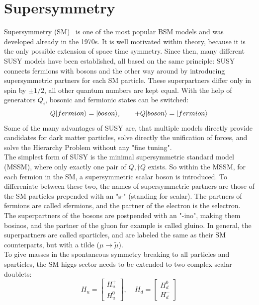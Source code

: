 \section{Supersymmetry}\label{sec:SUSY}
Supersymmetry (SM)~\cite{SUSYOriginal,SUSYPrimer} is one of the most popular BSM models and was developed already in the 1970s. It is well motivated within theory, because it is the only possible extension of space time symmetry. Since then, many different SUSY models have been established, all based on the same principle: SUSY connects fermions with bosons and the other way around by introducing supersymmetric partners for each SM particle. These superpartners differ only in spin by $\pm1/2$, all other quantum numbers are kept equal. With the help of generators $Q_i$, bosonic and fermionic states can be switched:
\begin{equation}
  Q\lvert fermion\rangle=\lvert boson\rangle,~~~~~~+ Q\lvert boson\rangle=\lvert fermion\rangle
\end{equation}
Some of the many advantages of SUSY are, that multiple models directly provide candidates for dark matter particles, solve directly the unification of forces, and solve the Hierarchy Problem without any "fine tuning".\\
The simplest form of SUSY is the minimal supersymmetric standard model (MSSM), where only exactly one pair of $Q,\dagger{Q}$ exists. So within the MSSM, for each fermion in the SM, a supersymmetric scalar boson is introduced. To differeniate between these two, the names of supersymmetric partners are those of the SM particles prepended with an "s-" (standing for scalar). The partners of fermions are called sfermions, and \eg the partner of the electron is the selectron. The superpartners of the bosons are postpended with an "-ino", making them bosinos, and the partner of the gluon for example is called gluino. In general, the superpartners are called sparticles, and are labeled the same as their SM counterparts, but with a tilde ($\mu \to \tilde{\mu}$).\\
To give masses in the spontaneous symmetry breaking to all particles and sparticles, the SM higgs sector needs to be extended to two complex scalar doublets:
\begin{equation}
H_u=  \left[
  \begin{matrix}
    H_u^+ \\
    H_u^0
  \end{matrix}
  \right],~~~~~
  H_d=  \left[
    \begin{matrix}
      H_d^0 \\
      H_d^-
    \end{matrix}
    \right]
\end{equation}
